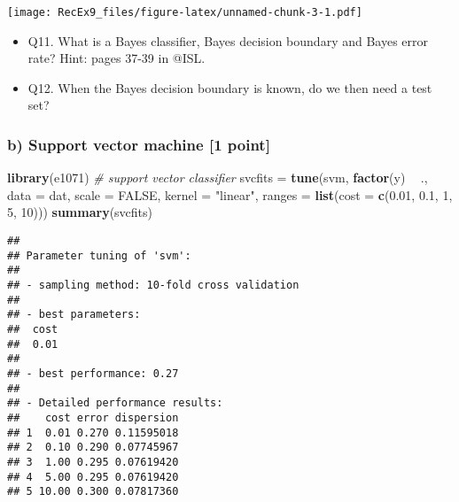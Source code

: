 \documentclass[]{article}
\newenvironment{Shaded}{\begin{snugshade}}{\end{snugshade}}
\newcommand{\KeywordTok}[1]{\textcolor[rgb]{0.13,0.29,0.53}{\textbf{#1}}}
\newcommand{\DataTypeTok}[1]{\textcolor[rgb]{0.13,0.29,0.53}{#1}}
\newcommand{\DecValTok}[1]{\textcolor[rgb]{0.00,0.00,0.81}{#1}}
\newcommand{\FloatTok}[1]{\textcolor[rgb]{0.00,0.00,0.81}{#1}}
\newcommand{\StringTok}[1]{\textcolor[rgb]{0.31,0.60,0.02}{#1}}
\newcommand{\CommentTok}[1]{\textcolor[rgb]{0.56,0.35,0.01}{\textit{#1}}}
\newcommand{\OtherTok}[1]{\textcolor[rgb]{0.56,0.35,0.01}{#1}}
\newcommand{\OperatorTok}[1]{\textcolor[rgb]{0.81,0.36,0.00}{\textbf{#1}}}
\newcommand{\NormalTok}[1]{#1}
\providecommand{\tightlist}{%
  \setlength{\itemsep}{0pt}\setlength{\parskip}{0pt}}
\begin{document}
\texttt{[image: RecEx9\_files/figure-latex/unnamed-chunk-3-1.pdf]}

\begin{itemize}
\tightlist
\item
  Q11. What is a Bayes classifier, Bayes decision boundary and Bayes
  error rate? Hint: pages 37-39 in @ISL.
\item
  Q12. When the Bayes decision boundary is known, do we then need a test
  set?
\end{itemize}

\subsubsection{b) Support vector machine {[}1
point{]}}\label{b-support-vector-machine-1-point}

\begin{Shaded}
\begin{Highlighting}[]
\KeywordTok{library}\NormalTok{(e1071)}
\CommentTok{# support vector classifier}
\NormalTok{svcfits =}\StringTok{ }\KeywordTok{tune}\NormalTok{(svm, }\KeywordTok{factor}\NormalTok{(y) }\OperatorTok{~}\StringTok{ }\NormalTok{., }\DataTypeTok{data =}\NormalTok{ dat, }\DataTypeTok{scale =} \OtherTok{FALSE}\NormalTok{, }\DataTypeTok{kernel =} \StringTok{"linear"}\NormalTok{, }
    \DataTypeTok{ranges =} \KeywordTok{list}\NormalTok{(}\DataTypeTok{cost =} \KeywordTok{c}\NormalTok{(}\FloatTok{0.01}\NormalTok{, }\FloatTok{0.1}\NormalTok{, }\DecValTok{1}\NormalTok{, }\DecValTok{5}\NormalTok{, }\DecValTok{10}\NormalTok{)))}
\KeywordTok{summary}\NormalTok{(svcfits)}
\end{Highlighting}
\end{Shaded}

\begin{verbatim}
## 
## Parameter tuning of 'svm':
## 
## - sampling method: 10-fold cross validation 
## 
## - best parameters:
##  cost
##  0.01
## 
## - best performance: 0.27 
## 
## - Detailed performance results:
##    cost error dispersion
## 1  0.01 0.270 0.11595018
## 2  0.10 0.290 0.07745967
## 3  1.00 0.295 0.07619420
## 4  5.00 0.295 0.07619420
## 5 10.00 0.300 0.07817360
\end{verbatim}
\end{document}
